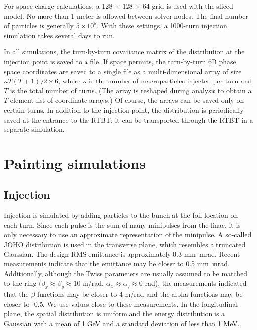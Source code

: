 For space charge calculations, a 128 $\times$ 128 $\times$ 64 grid is used with the sliced model. No more than 1 meter is allowed between solver nodes. The final number of particles is generally $5 \times 10^{5}$. With these settings, a 1000-turn injection simulation takes several days to run.

In all simulations, the turn-by-turn covariance matrix of the distribution at the injection point is saved to a file. If space permits, the turn-by-turn 6D phase space coordinates are saved to a single file as a multi-dimensional array of size $n T (T + 1) / 2 \times 6$, where $n$ is the number of macroparticles injected per turn and $T$ is the total number of turns. (The array is reshaped during analysis to obtain a $T$-element list of coordinate arrays.) Of course, the arrays can be saved only on certain turns. In addition to the injection point, the distribution is periodically saved at the entrance to the RTBT; it can be transported through the RTBT in a separate simulation.





\section{Painting simulations}

\subsection{Injection}

Injection is simulated by adding particles to the bunch at the foil location on each turn. Since each pulse is the sum of many minipulses from the linac, it is only necessary to use an approximate representation of the minipulse. A so-called JOHO distribution is used in the transverse plane, which resembles a truncated Gaussian. The design RMS emittance is approximately 0.3 mm~mrad. Recent measurements indicate that the emittance may be closer to 0.5 mm~mrad. Additionally, although the Twiss parameters are usually assumed to be matched to the ring ($\beta_x \approx \beta_y \approx 10$ m/rad, $\alpha_x \approx \alpha_y \approx 0$ rad), the measurements indicated that the $\beta$ functions may be closer to 4 m/rad and the alpha functions may be closer to -0.5. We use values close to these measurements. In the longitudinal plane, the spatial distribution is uniform and the energy distribution is a Gaussian with a mean of 1 GeV and a standard deviation of less than 1 MeV.

